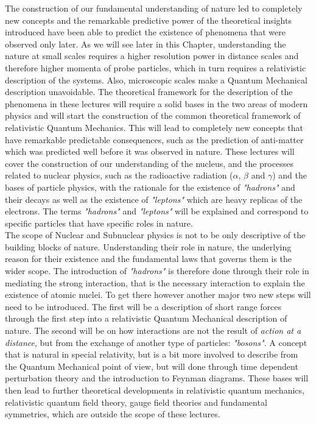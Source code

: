 The construction of our fundamental understanding of nature led to completely new concepts and the remarkable predictive power of the theoretical insights introduced have been able to predict the existence of phenomena that were observed only later. As we will see later in this Chapter, understanding the nature at small scales requires a higher resolution power in distance scales and therefore higher momenta of probe particles, which in turn requires a relativistic description of the systems. Also, microscopic scales make a Quantum Mechanical description unavoidable. The theoretical framework for the description of the phenomena in these lectures will require a solid bases in the two areas of modern physics and will start the construction of the common theoretical framework of relativistic Quantum Mechanics. This will lead to completely new concepts that have remarkable predictable consequences, such as the prediction of anti-matter which was predicted well before it was observed in nature. These lectures will cover the construction of our understanding of the nucleus, and the processes related to nuclear physics, such as the radioactive radiation ($\alpha$, $\beta$ and $\gamma$) and the bases of particle physics, with the rationale for the existence of {\it "hadrons"} and their decays as well as the existence of {\it "leptons"} which are heavy replicas of the electrons. The terms {\it "hadrons"} and {\it "leptons"} will be explained and correspond to specific particles that have specific roles in nature. \\

The scope of Nuclear and Subnuclear physics is not to be only descriptive of the building blocks of nature. Understanding their role in nature, the underlying reason for their existence and the fundamental laws that governs them is the wider scope. The introduction of {\it "hadrons"} is therefore done through their role in mediating the strong interaction, that is the necessary interaction to explain the existence of atomic nuclei. To get there however another major two new steps will need to be introduced. The first will be a description of short range forces through the first step into a relativistic Quantum Mechanical description of nature. The second will be on how interactions are not the result of {\it action at a distance}, but from the exchange of another type of particles: {\it "bosons"}. A concept that is natural in special relativity, but is a bit more involved to describe from the Quantum Mechanical point of view, but will done through time dependent perturbation theory and the introduction to Feynman diagrams. These bases will then lead to further theoretical developments in relativistic quantum mechanics, relativistic quantum field theory, gauge field theories and fundamental symmetries, which are outside the scope of these lectures. \\

